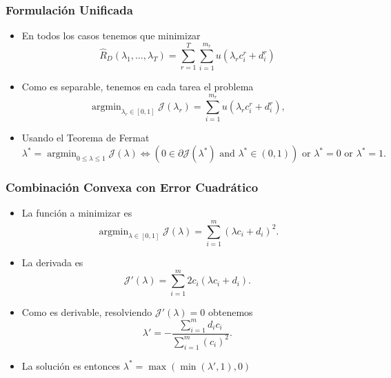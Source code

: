 \documentclass{beamer}
\DeclareMathOperator*{\argmin}{arg\min}
\newcommand{\opt}[1]{{#1}^*}
\newcommand{\ntasks}{T}
\newcommand{\npertask}{m}
\newcommand{\sample}{D}
\newcommand{\risk}{R}
\newcommand{\emprisk}{\hat{\risk}_{\sample}}
\begin{document}
\begin{frame}
      \frametitle{Formulación Unificada}

      \begin{itemize}
            \item En todos los casos tenemos que minimizar 
            \begin{equation}
                  \nonumber
                  \emprisk(\lambda_1, \ldots, \lambda_\ntasks) =
                  \sum_{r=1}^\ntasks \sum_{i=1}^{\npertask_r} u(\lambda_r c_i^r + d_i^r)
            \end{equation}
            \item Como es separable, tenemos en cada tarea el problema
            \begin{equation}
                  \nonumber
                  \argmin_{\lambda_r \in [0, 1]} \mathcal{J}(\lambda_r) = \sum_{i=1}^{\npertask_r} u(\lambda_r c_i^r + d_i^r),
            \end{equation}
            \item Usando el Teorema de Fermat
            \begin{equation}
                  \nonumber
                  \lambda^* = \argmin_{0 \leq \lambda \leq 1} \mathcal{J}(\lambda) \iff (0 \in \partial \mathcal{J}(\lambda^*) \text{ and } \lambda^* \in (0, 1) ) \text{ or } \lambda^*=0 \text{ or } \lambda^*=1 .
              \end{equation}
      \end{itemize}

\end{frame}


\begin{frame}
      \frametitle{Combinación Convexa con Error Cuadrático}

      \begin{itemize}
            \item La función a minimizar es 
            \begin{equation}
                  \nonumber
                  \argmin_{\lambda \in [0, 1]} \mathcal{J}(\lambda) = \sum_{i=1}^{\npertask} \left({\lambda c_i + d_i}\right)^2 .
            \end{equation}
            \item La derivada es
            \begin{equation}
                  \nonumber
                  \mathcal{J}'(\lambda) = \sum_{i=1}^\npertask 2 c_i (\lambda c_i + d_i) .
            \end{equation}
            \item Como es derivable, resolviendo $\mathcal{J}'(\lambda)= 0$ obtenemos
            \begin{equation*}
                  \lambda' =  -\frac{\sum_{i=1}^{\npertask} d_i c_i }{\sum_{i=1}^{\npertask} (c_i)^2 } .
                  \end{equation*}
            \item La solución es entonces $\opt{\lambda} = \max(\min(\lambda', 1), 0)$
      \end{itemize}
        
\end{frame}
\end{document}
